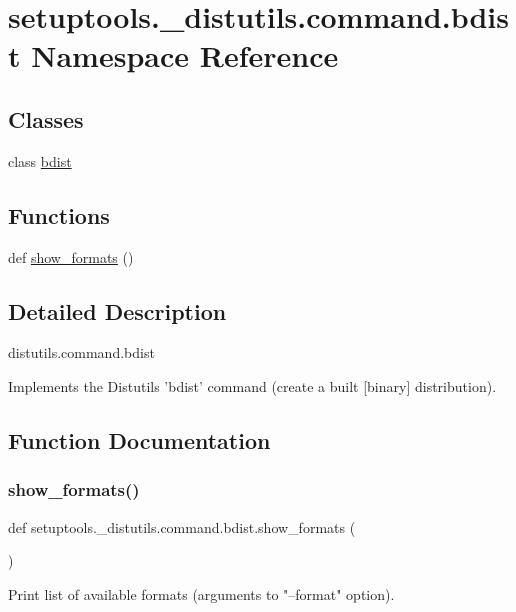 \hypertarget{namespacesetuptools_1_1__distutils_1_1command_1_1bdist}{}\section{setuptools.\+\_\+distutils.\+command.\+bdist Namespace Reference}
\label{namespacesetuptools_1_1__distutils_1_1command_1_1bdist}
\subsection*{Classes}
\begin{DoxyCompactItemize}
\item 
class \hyperlink{classsetuptools_1_1__distutils_1_1command_1_1bdist_1_1bdist}{bdist}
\end{DoxyCompactItemize}
\subsection*{Functions}
\begin{DoxyCompactItemize}
\item 
def \hyperlink{namespacesetuptools_1_1__distutils_1_1command_1_1bdist_a67333a54ca388b90a564e5ec9cf1f28f}{show\+\_\+formats} ()
\end{DoxyCompactItemize}


\subsection{Detailed Description}
\begin{DoxyVerb}distutils.command.bdist

Implements the Distutils 'bdist' command (create a built [binary]
distribution).\end{DoxyVerb}
 

\subsection{Function Documentation}
\mbox{\label{namespacesetuptools_1_1__distutils_1_1command_1_1bdist_a67333a54ca388b90a564e5ec9cf1f28f}} 
\subsubsection{\texorpdfstring{show\+\_\+formats()}{show\_formats()}}
{\footnotesize\ttfamily def setuptools.\+\_\+distutils.\+command.\+bdist.\+show\+\_\+formats (\begin{DoxyParamCaption}{ }\end{DoxyParamCaption})}

\begin{DoxyVerb}Print list of available formats (arguments to "--format" option).
\end{DoxyVerb}
 